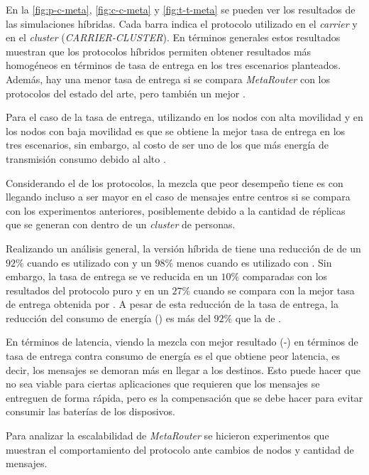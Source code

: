 En la \ref{fig:p-c-meta}, \ref{fig:c-c-meta} y \ref{fig:t-t-meta} se pueden ver
los resultados de las simulaciones híbridas. Cada barra indica el protocolo
utilizado en el \textit{carrier} y en el \textit{cluster}
(\textit{CARRIER-CLUSTER}). En términos generales estos resultados muestran que
los protocolos híbridos permiten obtener resultados más homogéneos en términos
de tasa de entrega en los tres escenarios planteados. Además, hay una menor tasa
de entrega si se compara \textit{MetaRouter} con los protocolos del estado del
arte, pero también un mejor \overhead.

Para el caso de la tasa de entrega, utilizando \epidemic{} en los nodos con alta
movilidad y \syf{} en los nodos con baja movilidad es que se obtiene la mejor
tasa de entrega en los tres escenarios, sin embargo, al costo de ser uno de los
que más energía de transmisión consumo debido al alto \overhead{}.

Considerando el \overhead{} de los protocolos, la mezcla que peor desempeño
tiene es \maxprop{} con \syf{} llegando incluso a ser mayor en el caso de
mensajes entre centros si se compara con los experimentos anteriores,
posiblemente debido a la cantidad de réplicas que se generan con \maxprop{}
dentro de un \textit{cluster} de personas.

Realizando un análisis general, la versión híbrida de \prophet{} tiene una
reducción de \overhead{} de un $92\%$ cuando es utilizado con \syf{} y un $98\%$
menos cuando es utilizado con \syw. Sin embargo, la tasa de entrega se ve
reducida en un $10\%$ comparadas con los resultados del protocolo puro y en un
$27\%$ cuando se compara con la mejor tasa de entrega obtenida por \maxprop. A
pesar de esta reducción de la tasa de entrega, la reducción del consumo de
energía (\overhead) es más del $92\%$ que la de \maxprop.


En términos de latencia, viendo la mezcla con mejor resultado (\prophet-\syf) en
términos de tasa de entrega contra consumo de energía es el que obtiene peor
latencia, es decir, los mensajes se demoran más en llegar a los destinos. Esto
puede hacer que no sea viable para ciertas aplicaciones que requieren que los
mensajes se entreguen de forma rápida, pero es la compensación que se debe hacer
para evitar consumir las baterías de los disposivos.


Para analizar la escalabilidad de \textit{MetaRouter} se hicieron experimentos
que muestran el comportamiento del protocolo ante cambios de nodos y cantidad de
mensajes.


